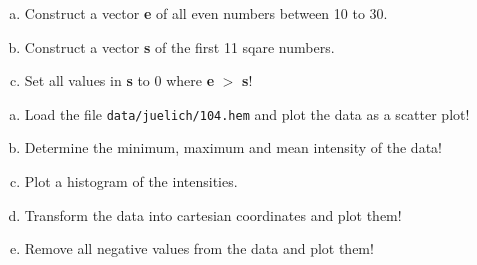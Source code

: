 \begin{frame}

  \begin{Exercise}
    \begin{enumerate}[a)]
      \item  Construct a vector \textbf{e} of all even numbers between 10 to 30.
      \item  Construct a vector \textbf{s} of the first 11 sqare numbers.
      \item  Set all values in \textbf{s} to 0 where \textbf{e} $>$ \textbf{s}!
    \end{enumerate}
  \end{Exercise}

  \begin{Exercise}
    \begin{enumerate}[a)]
    \item Load the file \texttt{data/juelich/104.hem} and plot the data as a
      scatter plot!
    \item Determine the minimum, maximum and mean
      intensity of the data!
    \item Plot a histogram of the intensities.
    \item Transform the data into cartesian coordinates and plot them!
    \item Remove all negative values from the data and plot them!
    \end{enumerate}
  \end{Exercise}
\end{frame}



